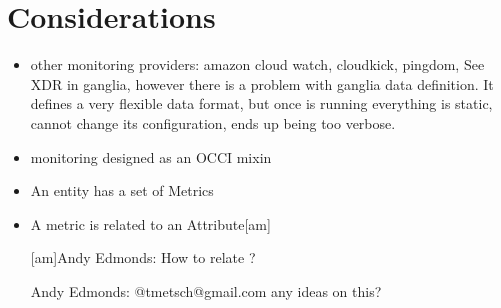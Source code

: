 \documentclass[12pt]{article}  %
\begin{document}
\section*{Considerations}
\begin{itemize}
\item other monitoring providers: amazon cloud watch, cloudkick, pingdom, See XDR in ganglia, however there is a problem with ganglia data definition. It defines a very flexible data format, but once is running everything is static, cannot change its configuration, ends up being too verbose. 
\item monitoring designed as an OCCI mixin
\item An entity has a set of Metrics
\item A metric is related to an Attribute[am]

{\color{blue}
[am]Andy Edmonds:
How to relate
?

Andy Edmonds:
@tmetsch@gmail.com any ideas on this?
}


\end{itemize}
\end{document}
